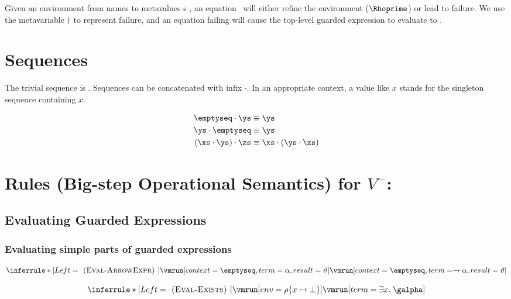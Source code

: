 \documentclass[]{article}
\begin{document}

Given an environment from names to metavalues {\valpha}s \Rho, an equation \eq
~will either refine the environment ($\Rhoprime$) or lead to failure. We use
the metavariable $\dagger$ to represent failure, and an equation failing will
cause the top-level guarded expression to evaluate to \reject. 

{}\eqfail
    
    
    \section{Sequences}
    
    The trivial sequence is \emptyseq. Sequences can be concatenated with infix 
$\cdot$. In an appropriate context, a value like $x$ stands for 
the singleton sequence containing $x$. 

\begin{align*}
    \emptyseq \cdot \ys &\equiv \ys \\
    \ys \cdot \emptyseq &\equiv \ys \\
    (\xs \cdot \ys) \cdot \zs &\equiv \xs \cdot (\ys \cdot \zs)
\end{align*}

\section{Rules (Big-step Operational Semantics) for $V^{-}$:}
    
\subsection{Evaluating Guarded Expressions}


\subsubsection{Evaluating simple parts of guarded expressions}

\[
\inferrule*[Left=\textsc{ (Eval-ArrowExpr) }]
    {\vmrun[context=\emptyseq,term=\alpha,result=\vartheta]}
    {\vmrun[context=\emptyseq, term=\rightarrow \alpha,result=\vartheta]}
\]

\[
\inferrule*[Left=\textsc{ (Eval-Exists) }]
    {\vmrun[env=\rho\{x \mapsto \bot \}]}
    {\vmrun[term=\exists x.\; \galpha]}
\]
\end{document}
